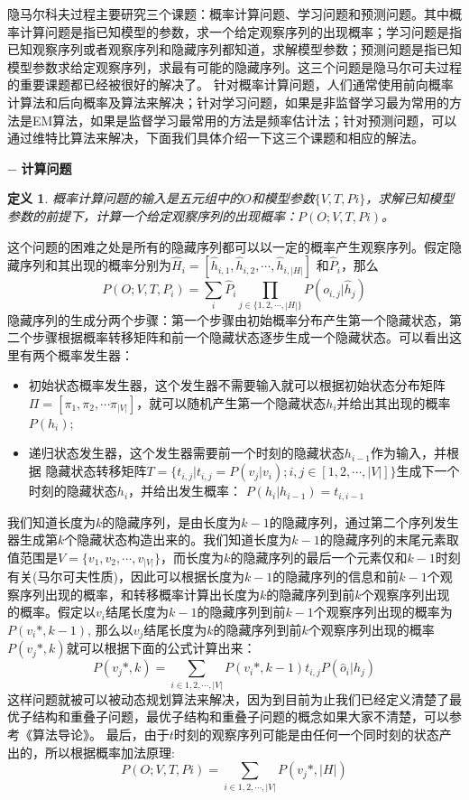 \documentclass[twoside,a4paper,12pt]{book}%
\newtheorem{definition}{定义}
\begin{document}
隐马尔科夫过程主要研究三个课题：概率计算问题、学习问题和预测问题。其中概率计算问题是指已知模型的参数，求一个给定观察序列的出现概率；学习问题是指已知观察序列或者观察序列和隐藏序列都知道，求解模型参数；预测问题是指已知模型参数求给定观察序列，求最有可能的隐藏序列。这三个问题是隐马尔可夫过程的重要课题都已经被很好的解决了。
针对概率计算问题，人们通常使用前向概率计算法和后向概率及算法来解决；针对学习问题，如果是非监督学习最为常用的方法是EM算法，如果是监督学习最常用的方法是频率估计法；针对预测问题，可以通过维特比算法来解决，下面我们具体介绍一下这三个课题和相应的解法。

$-$  \textbf{计算问题}
\begin{definition}
概率计算问题的输入是五元组中的$O$和模型参数$\{V,T,Pi\}$，求解已知模型参数的前提下，计算一个给定观察序列的出现概率：$P(O;V,T,Pi)$。
\end{definition}


这个问题的困难之处是所有的隐藏序列都可以以一定的概率产生观察序列。假定隐藏序列和其出现的概率分别为$\hat{H}_i=[\hat{h}_{i,1},\hat{h}_{i,2},\cdots,\hat{h}_{i,|H|}]$ 和$\hat{P}_i$，那么
$$
P(O;V,T,P_i)=\sum_{i}{\hat{P}_i\prod_{j\in\{1,2,\cdots,|H|\}}{P(o_{i,j}|\hat{h}_j)}}
$$
隐藏序列的生成分两个步骤：第一个步骤由初始概率分布产生第一个隐藏状态，第二个步骤根据概率转移矩阵和前一个隐藏状态逐步生成一个隐藏状态。可以看出这里有两个概率发生器：
\begin{itemize}
 \item 初始状态概率发生器，这个发生器不需要输入就可以根据初始状态分布矩阵$\Pi=[\pi_1,\pi_2,\cdots \pi_{|V|}]$，就可以随机产生第一个隐藏状态$h_i$并给出其出现的概率$P(h_i)$;
 \item 递归状态发生器，这个发生器需要前一个时刻的隐藏状态$h_{i-1}$作为输入，并根据 隐藏状态转移矩阵$T=\{t_{i,j}|t_{i,j}=P(v_j|v_i); i,j \in [1,2,\cdots,|V|]\}$生成下一个时刻的隐藏状态$h_{i}$，并给出发生概率：
 $
 P(h_i|h_{i-1}) = t_{i,i-1}
 $
\end{itemize}
我们知道长度为$k$的隐藏序列，是由长度为$k-1$的隐藏序列，通过第二个序列发生器生成第$k$个隐藏状态构造出来的。我们知道长度为$k-1$的隐藏序列的末尾元素取值范围是$V=\{v_1,v_2,\cdots,v_{|V|}\}$，而长度为$k$的隐藏序列的最后一个元素仅和$k-1$时刻有关(马尔可夫性质)，因此可以根据长度为$k-1$的隐藏序列的信息和前$k-1$个观察序列出现的概率，和转移概率计算出长度为$k$的隐藏序列到前$k$个观察序列出现的概率。假定以$v_i$结尾长度为$k-1$的隐藏序列到前$k-1$个观察序列出现的概率为$P(v_i*,k-1)$, 那么以$v_j$结尾长度为$k$的隐藏序列到前$k$个观察序列出现的概率$P(v_j*,k)$就可以根据下面的公式计算出来：
$$
P(v_j*,k)=\sum_{i\in{1,2,\cdots,|V|}}{P(v_i*,k-1)t_{i,j}P(\hat{o}_i|h_j)}
$$
这样问题就被可以被动态规划算法来解决，因为到目前为止我们已经定义清楚了最优子结构和重叠子问题，最优子结构和重叠子问题的概念如果大家不清楚，可以参考《算法导论》。
最后，由于$t$时刻的观察序列可能是由任何一个同时刻的状态产出的，所以根据概率加法原理:
$$P(O;V,T,Pi)=\sum_{i\in{1,2,\cdots,|V|}}P(v_j*,|H|)$$
\end{document}
